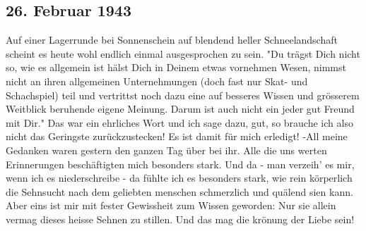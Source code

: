 \subsection{26. Februar 1943}

Auf einer Lagerrunde bei Sonnenschein auf blendend heller Schneelandschaft scheint es heute wohl endlich einmal ausgesprochen zu sein.
"Du tr\"{a}gst Dich nicht so, wie es allgemein ist h\"{a}lst Dich in Deinem etwas vornehmen Wesen, nimmst nicht an ihren allgemeinen Unternehmungen (doch fast nur Skat- und Schachspiel) teil und vertrittst noch dazu eine auf besseres Wissen und gr\"{o}sserem Weitblick beruhende eigene Meinung.
Darum ist auch nicht ein jeder gut Freund mit Dir."
Das war ein ehrliches Wort und ich sage dazu, gut, so brauche ich also nicht das Geringste zur\"{u}ckzustecken!
Es ist damit f\"{u}r mich erledigt!
-All meine Gedanken waren gestern den ganzen Tag \"{u}ber bei ihr.
Alle die uns werten Erinnerungen besch\"{a}ftigten mich besonders stark.
Und da - man verzeih' es mir, wenn ich es niederschreibe - da f\"{u}hlte ich es besonders stark, wie rein k\"{o}rperlich die Sehnsucht nach dem geliebten menschen schmerzlich und qu\"{a}lend sien kann.
Aber eins ist mir mit fester Gewissheit zum Wissen geworden: Nur sie allein vermag dieses heisse Sehnen zu stillen.
Und das mag die kr\"{o}nung der Liebe sein!

\clearpage
